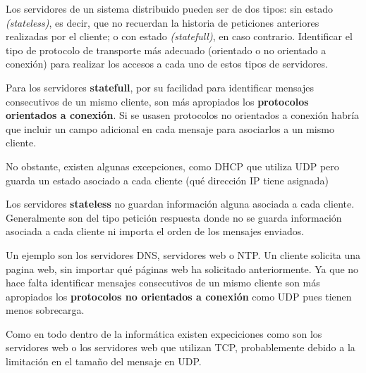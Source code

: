   \begin{problem}[18]
  Los servidores de un sistema distribuido pueden ser de dos tipos: sin estado
  \textit{(stateless)}, es decir, que no recuerdan la historia de peticiones anteriores realizadas
  por el cliente; o con estado \textit{(statefull)}, en caso contrario. Identificar el tipo de protocolo de transporte más
  adecuado (orientado o no orientado a conexión) para realizar los accesos
  a cada uno de estos tipos de servidores.
  \solution

  Para los servidores \textbf{statefull}, por su facilidad para identificar mensajes consecutivos de un mismo cliente, son
más apropiados los \textbf{protocolos orientados a conexión}. Si se usasen protocolos no orientados a conexión habría que incluir un campo adicional en cada mensaje para asociarlos a un mismo cliente.

No obstante, existen algunas excepciones, como DHCP que utiliza UDP pero guarda un estado asociado a cada cliente (qué dirección IP tiene asignada)

 Los servidores \textbf{stateless} no guardan información alguna asociada a cada cliente. Generalmente son del tipo petición respuesta donde no se guarda información asociada a cada cliente ni importa el orden de los mensajes enviados.

 Un ejemplo son los servidores DNS, servidores web o NTP. Un cliente solicita una
pagina web, sin importar qué páginas web ha solicitado anteriormente. Ya que no hace falta identificar mensajes consecutivos de un mismo cliente son más apropiados los \textbf{protocolos no orientados a conexión} como UDP pues tienen menos sobrecarga.

Como en todo dentro de la informática existen expeciciones como son los servidores web o los servidores web que utilizan TCP, probablemente debido a la limitación en el tamaño del mensaje en
UDP.
  \end{problem}

